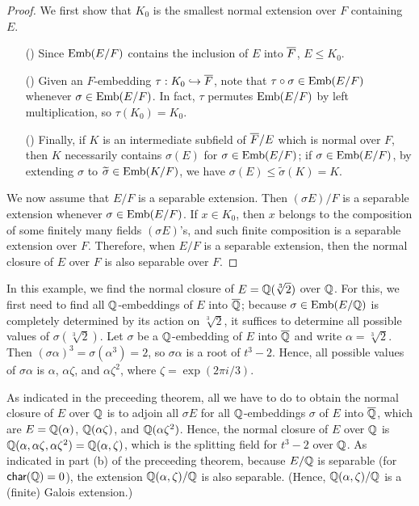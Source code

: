 \begin{proof}
    We first show that $K_0$ is the smallest normal extension over $F$ containing $E$.
    \begin{enumerate}
        \item[(\romannumeral 1)]
        {
            Since ${\textrm{Emb}({E/F})}$ contains the inclusion of $E$ into $\overline{F}$, $E\leq K_0$.        
        }
        \item[(\romannumeral 2)]
        {
            Given an $F$-embedding $\tau: K_0\hookrightarrow\overline{F}$, note that $\tau\circ\sigma\in{\textrm{Emb}({E/F})}$ whenever $\sigma\in{\textrm{Emb}({E/F})}$.
            In fact, $\tau$ permutes ${\textrm{Emb}({E/F})}$ by left multiplication, so $\tau(K_0)=K_0$.
        }
        \item[(\romannumeral 3)]
        {
            Finally, if $K$ is an intermediate subfield of $\overline{F}/E$ which is normal over $F$, then $K$ necessarily contains $\sigma(E)$ for $\sigma\in{\textrm{Emb}({E/F})}$; if $\sigma\in{\textrm{Emb}({E/F})}$, by extending $\sigma$ to $\widetilde{\sigma}\in{\textrm{Emb}({K/F})}$, we have $\sigma(E)\leq\widetilde{\sigma}(K)=K$.
        }
    \end{enumerate}
    
    We now assume that $E/F$ is a separable extension.
    Then $(\sigma E)/F$ is a separable extension whenever $\sigma\in{\textrm{Emb}({E/F})}$.
    If $x\in K_0$, then $x$ belongs to the composition of some finitely many fields $(\sigma E)$'s, and such finite composition is a separable extension over $F$.
    Therefore, when $E/F$ is a separable extension, then the normal closure of $E$ over $F$ is also separable over $F$.
\end{proof}
\begin{exmp}
    In this example, we find the normal closure of $E={\mathbb{Q}}(\sqrt[3]{2})$ over ${\mathbb{Q}}$.
    For this, we first need to find all ${\mathbb{Q}}$-embeddings of $E$ into $\overline{{\mathbb{Q}}}$; because $\sigma\in{\textrm{Emb}({E/{\mathbb{Q}}})}$ is completely determined by its action on $\sqrt[3]{2}$, it suffices to determine all possible values of $\sigma(\sqrt[3]{2})$.
    Let $\sigma$ be a ${\mathbb{Q}}$-embedding of $E$ into $\overline{{\mathbb{Q}}}$ and write $\alpha=\sqrt[3]{2}$.
    Then $(\sigma\alpha)^3=\sigma(\alpha^3)=2$, so $\sigma\alpha$ is a root of $t^3-2$.
    Hence, all possible values of $\sigma\alpha$ is $\alpha$, $\alpha\zeta$, and $\alpha\zeta^2$, where $\zeta=\exp(2\pi i/3)$.

    As indicated in the preceeding theorem, all we have to do to obtain the normal closure of $E$ over ${\mathbb{Q}}$ is to adjoin all $\sigma E$ for all ${\mathbb{Q}}$-embeddings $\sigma$ of $E$ into $\overline{{\mathbb{Q}}}$, which are $E={\mathbb{Q}}(\alpha)$, ${\mathbb{Q}}(\alpha\zeta)$, and ${\mathbb{Q}}(\alpha\zeta^2)$.
    Hence, the normal closure of $E$ over ${\mathbb{Q}}$ is ${\mathbb{Q}}(\alpha, \alpha\zeta, \alpha\zeta^2)={\mathbb{Q}}(\alpha, \zeta)$, which is the splitting field for $t^3-2$ over ${\mathbb{Q}}$.
    As indicated in part (b) of the preceeding theorem, because $E/{\mathbb{Q}}$ is separable (for ${\textsf{char}({{\mathbb{Q}}})}=0$), the extension ${\mathbb{Q}}(\alpha, \zeta)/{\mathbb{Q}}$ is also separable.
    (Hence, ${\mathbb{Q}}(\alpha, \zeta)/{\mathbb{Q}}$ is a (finite) Galois extension.)
\end{exmp}

